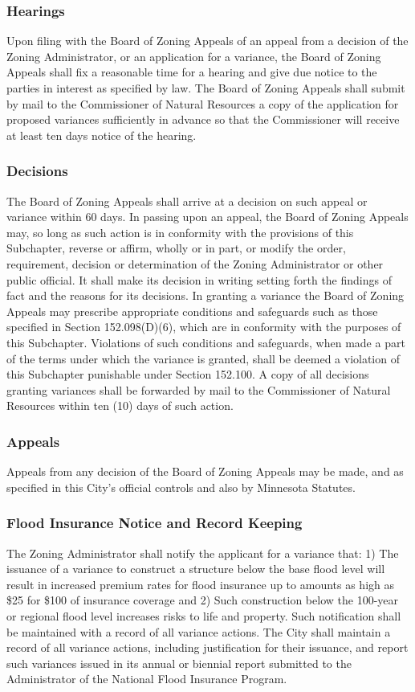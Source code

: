 \subsubsection{Hearings}
Upon filing with the Board of Zoning Appeals of an appeal from a decision of the Zoning Administrator, or an application for a variance, the Board of Zoning Appeals shall fix a reasonable time for a hearing and give due notice to the parties in interest as specified by law. The Board of Zoning Appeals shall submit by mail to the Commissioner of Natural Resources a copy of the application for proposed variances sufficiently in advance so that the Commissioner will receive at least ten days notice of the hearing.
\subsubsection{Decisions}
The Board of Zoning Appeals shall arrive at a decision on such appeal or variance within 60 days. In passing upon an appeal, the Board of Zoning Appeals may, so long as such action is in conformity with the provisions of this Subchapter, reverse or affirm, wholly or in part, or modify the order, requirement, decision or determination of the Zoning Administrator or other public official. It shall make its decision in writing setting forth the findings of fact and the reasons for its decisions. In granting a variance the Board of Zoning Appeals may prescribe appropriate conditions and safeguards such as those specified in Section 152.098(D)(6), which are in conformity with the purposes of this Subchapter. Violations of such conditions and safeguards, when made a part of the terms under which the variance is granted, shall be deemed a violation of this Subchapter punishable under Section 152.100. A copy of all decisions granting variances shall be forwarded by mail to the Commissioner of Natural Resources within ten (10) days of such action.
\subsubsection{Appeals}
Appeals from any decision of the Board of Zoning Appeals may be made, and as specified in this City’s official controls and also by Minnesota Statutes.
\subsubsection{Flood Insurance Notice and Record Keeping}
The Zoning Administrator shall notify the applicant for a variance that: 1) The issuance of a variance to construct a structure below the base flood level will result in increased premium rates for flood insurance up to amounts as high as \$25 for \$100 of insurance coverage and 2) Such construction below the 100-year or regional flood level increases risks to life and property. Such notification shall be maintained with a record of all variance actions. The City shall maintain a record of all variance actions, including justification for their issuance, and report such variances issued in its annual or biennial report submitted to the Administrator of the National Flood Insurance Program.
